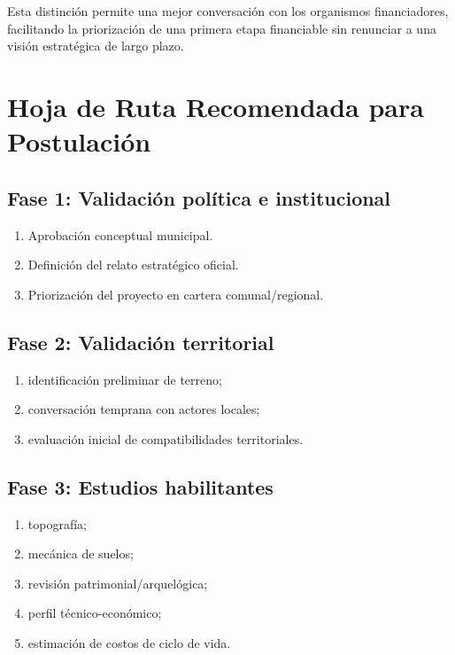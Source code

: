 \documentclass[12pt,letterpaper]{article}
\begin{document}
Esta distinción permite una mejor conversación con los organismos financiadores, facilitando la priorización de una primera etapa financiable sin renunciar a una visión estratégica de largo plazo.

\section{Hoja de Ruta Recomendada para Postulación}

\subsection{Fase 1: Validación política e institucional}

\begin{enumerate}
    \item Aprobación conceptual municipal.
    \item Definición del relato estratégico oficial.
    \item Priorización del proyecto en cartera comunal/regional.
\end{enumerate}

\subsection{Fase 2: Validación territorial}

\begin{enumerate}
    \item identificación preliminar de terreno;
    \item conversación temprana con actores locales;
    \item evaluación inicial de compatibilidades territoriales.
\end{enumerate}

\subsection{Fase 3: Estudios habilitantes}

\begin{enumerate}
    \item topografía;
    \item mecánica de suelos;
    \item revisión patrimonial/arquelógica;
    \item perfil técnico-económico;
    \item estimación de costos de ciclo de vida.
\end{enumerate}
\end{document}
